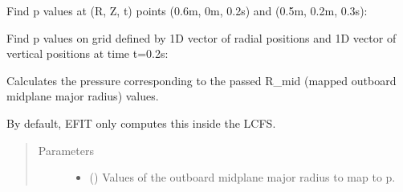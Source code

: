 \documentclass[letterpaper,10pt,english]{sphinxmanual}
\begin{document}
\begin{fulllineitems}
\begin{fulllineitems}
Find p values at (R, Z, t) points (0.6m, 0m, 0.2s) and (0.5m, 0.2m, 0.3s):

\begin{sphinxVerbatim}[commandchars=\\\{\}]
  \PYG{p}{[} \PYG{p}{]} \PYG{p}{[} \PYG{p}{]} \PYG{p}{[} \PYG{p}{]} 
\end{sphinxVerbatim}

Find p values on grid defined by 1D vector of radial positions 
and 1D vector of vertical positions  at time t=0.2s:

\begin{sphinxVerbatim}[commandchars=\\\{\}]
     
\end{sphinxVerbatim}

\end{fulllineitems}


\begin{fulllineitems}
\label{\detokenize{eqtools:eqtools.core.Equilibrium.rmid2p}}
Calculates the pressure corresponding to the passed R\_mid (mapped outboard midplane major radius) values.

By default, EFIT only computes this inside the LCFS.
\begin{quote}\begin{description}
\item[{Parameters}] \leavevmode\begin{itemize}
\item {} 
 () \textendash{} Values of the outboard midplane
major radius to map to p.


\end{itemize}
\end{description}
\end{quote}
\end{fulllineitems}
\end{fulllineitems}
\end{document}
